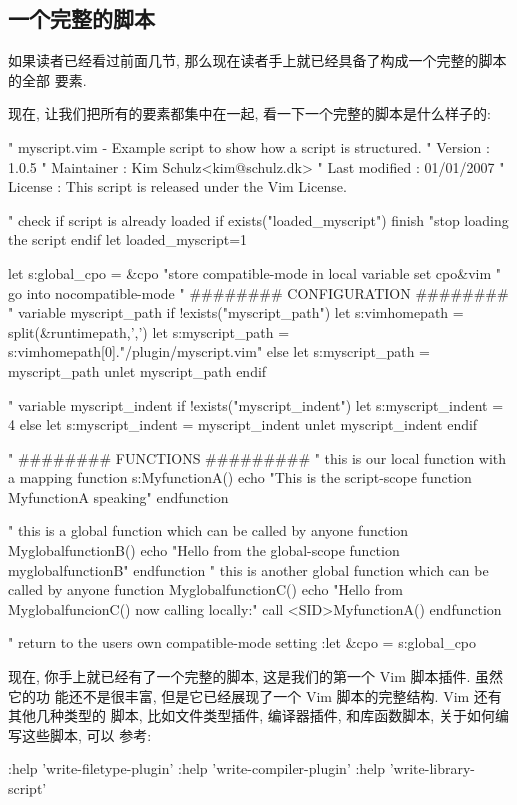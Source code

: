 \subsection{一个完整的脚本}
\label{subsec:putting_it_all_together}

如果读者已经看过前面几节, 那么现在读者手上就已经具备了构成一个完整的脚本的全部
要素.

现在, 让我们把所有的要素都集中在一起, 看一下一个完整的脚本是什么样子的:
\begin{vimcode}
" myscript.vim  - Example script to show how a script is structured.
" Version       : 1.0.5
" Maintainer    : Kim Schulz<kim@schulz.dk>
" Last modified : 01/01/2007
" License       : This script is released under the Vim License.

" check if script is already loaded
if exists("loaded_myscript")
	finish "stop loading the script
endif
let loaded_myscript=1
\end{vimcode}
\begin{vimcode}

	let s:global_cpo = &cpo  "store compatible-mode in local variable
	set cpo&vim              " go into nocompatible-mode
" ######## CONFIGURATION ########
" variable myscript_path
if !exists("myscript_path")
	let s:vimhomepath = split(&runtimepath,',')
	let s:myscript_path = s:vimhomepath[0]."/plugin/myscript.vim"
else
	let s:myscript_path = myscript_path
	unlet myscript_path
endif

" variable myscript_indent
if !exists("myscript_indent")
	let s:myscript_indent = 4
else
	let s:myscript_indent = myscript_indent
	unlet myscript_indent
endif

	" ######## FUNCTIONS #########
	" this is our local function with a mapping
function s:MyfunctionA()
	echo "This is the script-scope function MyfunctionA speaking"
endfunction

" this is a global function which can be called by anyone
function MyglobalfunctionB()
	echo "Hello from the global-scope function myglobalfunctionB"
endfunction
" this is another global function which can be called by anyone
function MyglobalfunctionC()
	echo "Hello from MyglobalfuncionC() now calling locally:"
	call <SID>MyfunctionA()
endfunction

" return to the users own compatible-mode setting
:let &cpo = s:global_cpo
\end{vimcode}
现在, 你手上就已经有了一个完整的脚本, 这是我们的第一个 Vim 脚本插件.  虽然它的功
能还不是很丰富, 但是它已经展现了一个 Vim 脚本的完整结构. Vim 还有其他几种类型的
脚本, 比如文件类型插件, 编译器插件, 和库函数脚本, 关于如何编写这些脚本, 可以
参考:
\begin{vimcode}
:help 'write-filetype-plugin'
:help 'write-compiler-plugin'
:help 'write-library-script'
\end{vimcode}

